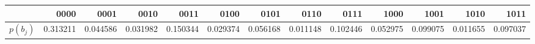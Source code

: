 \begin{tabular}{lrrrrrrrrrrrr}
\toprule
 & 0000 & 0001 & 0010 & 0011 & 0100 & 0101 & 0110 & 0111 & 1000 & 1001 & 1010 & 1011 \\
\midrule
$p(b_j)$ & 0.313211 & 0.044586 & 0.031982 & 0.150344 & 0.029374 & 0.056168 & 0.011148 & 0.102446 & 0.052975 & 0.099075 & 0.011655 & 0.097037 \\
\bottomrule
\end{tabular}
